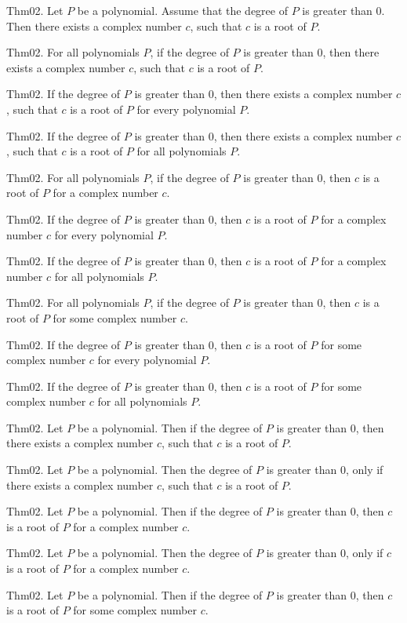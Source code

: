 \documentclass{article}
\begin{document}
Thm02. Let $P$ be a polynomial. Assume that the degree of $P$ is greater than $0$. Then there exists a complex number $c$, such that $c$ is a root of $P$.

Thm02. For all polynomials $P$, if the degree of $P$ is greater than $0$, then there exists a complex number $c$, such that $c$ is a root of $P$.

Thm02. If the degree of $P$ is greater than $0$, then there exists a complex number $c$, such that $c$ is a root of $P$ for every polynomial $P$.

Thm02. If the degree of $P$ is greater than $0$, then there exists a complex number $c$, such that $c$ is a root of $P$ for all polynomials $P$.

Thm02. For all polynomials $P$, if the degree of $P$ is greater than $0$, then $c$ is a root of $P$ for a complex number $c$.

Thm02. If the degree of $P$ is greater than $0$, then $c$ is a root of $P$ for a complex number $c$ for every polynomial $P$.

Thm02. If the degree of $P$ is greater than $0$, then $c$ is a root of $P$ for a complex number $c$ for all polynomials $P$.

Thm02. For all polynomials $P$, if the degree of $P$ is greater than $0$, then $c$ is a root of $P$ for some complex number $c$.

Thm02. If the degree of $P$ is greater than $0$, then $c$ is a root of $P$ for some complex number $c$ for every polynomial $P$.

Thm02. If the degree of $P$ is greater than $0$, then $c$ is a root of $P$ for some complex number $c$ for all polynomials $P$.

Thm02. Let $P$ be a polynomial. Then if the degree of $P$ is greater than $0$, then there exists a complex number $c$, such that $c$ is a root of $P$.

Thm02. Let $P$ be a polynomial. Then the degree of $P$ is greater than $0$, only if there exists a complex number $c$, such that $c$ is a root of $P$.

Thm02. Let $P$ be a polynomial. Then if the degree of $P$ is greater than $0$, then $c$ is a root of $P$ for a complex number $c$.

Thm02. Let $P$ be a polynomial. Then the degree of $P$ is greater than $0$, only if $c$ is a root of $P$ for a complex number $c$.

Thm02. Let $P$ be a polynomial. Then if the degree of $P$ is greater than $0$, then $c$ is a root of $P$ for some complex number $c$.
\end{document}
